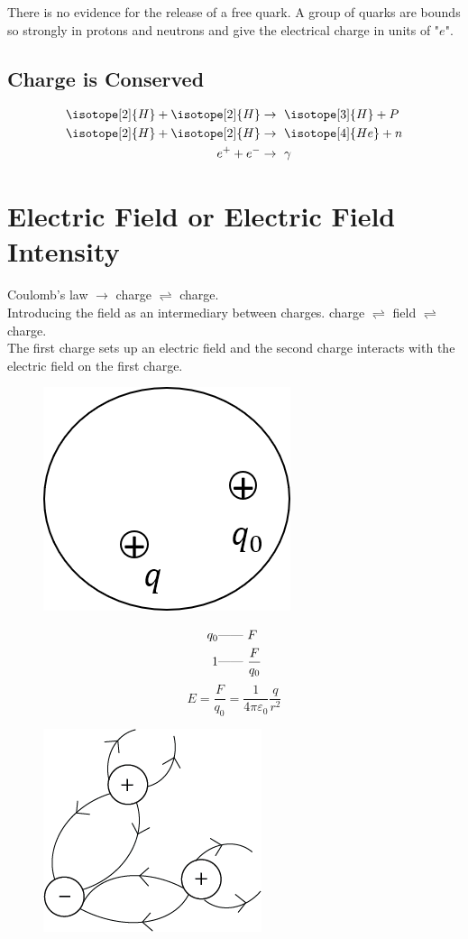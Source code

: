 \documentclass[12pt]{article}
\theoremstyle{definition}
\newcommand{\K}{\frac{1}{4\pi\varepsilon_0}}
\begin{document}
There is no evidence for the release of a free quark. A group of quarks are bounds so strongly in protons and neutrons and give the electrical charge in units of "$ e $".
\subsection{Charge is Conserved}
\begin{align*}
    \isotope[2]{H}+\isotope[2]{H} &\to\ \isotope[3]{H}+ P\\
    \isotope[2]{H}+\isotope[2]{H} &\to\ \isotope[4]{He}+ n\\
    e^+ +e^- &\to\ \gamma
\end{align*}
\section{Electric Field or Electric Field Intensity}
Coulomb's law $ \to $ charge $ \rightleftharpoons $ charge.\\
Introducing the field as an intermediary between charges. charge $ \rightleftharpoons $ field $ \rightleftharpoons $ charge.\\
The first charge sets up an electric field and the second charge interacts with the electric field on the first charge.
\begin{figure}[h]
    \centering
    \includegraphics{6.png}
\end{figure}
\begin{align*}
    q_0 \text{\----}\text{\----} &\ F\\
    1 \text{\----}\text{\----} &\ \frac{F}{q_0}
\end{align*}
\[E=\frac{F}{q_0}=\K \frac{q}{r^2}\]
\begin{figure}[h]
    \centering
    \includegraphics[scale=.5]{7.png}
\end{figure}
\end{document}
